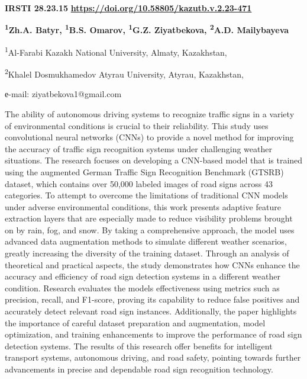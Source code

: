 \newpage
{\bfseries IRSTI 28.23.15}
\hfill {\bfseries \href{https://doi.org/10.58805/kazutb.v.2.23-471}{https://doi.org/10.58805/kazutb.v.2.23-471}}


\begin{center}
{\bfseries \textsuperscript{1}Zh.A. Batyr, \textsuperscript{1}B.S. Omarov,
\textsuperscript{1}G.Z. Ziyatbekova, \textsuperscript{2}A.D.
Mailybayeva}

\textsuperscript{1}Al-Farabi Kazakh National University, Almaty,
Kazakhstan,

\textsuperscript{2}Khalel Dosmukhamedov Atyrau University, Atyrau,
Kazakhstan,

е-mail: ziyatbekova1@gmail.com
\end{center}

The ability of autonomous driving systems to recognize traffic signs in
a variety of environmental conditions is crucial to their reliability.
This study uses convolutional neural networks (CNNs) to provide a novel
method for improving the accuracy of traffic sign recognition systems
under challenging weather situations. The research focuses on developing
a CNN-based model that is trained using the augmented German Traffic
Sign Recognition Benchmark (GTSRB) dataset, which contains over 50,000
labeled images of road signs across 43 categories. To attempt to
overcome the limitations of traditional CNN models under adverse
environmental conditions, this work presents adaptive feature extraction
layers that are especially made to reduce visibility problems brought on
by rain, fog, and snow. By taking a comprehensive approach, the model
uses advanced data augmentation methods to simulate different weather
scenarios, greatly increasing the diversity of the training dataset.
Through an analysis of theoretical and practical aspects, the study
demonstrates how CNNs enhance the accuracy and efficiency of road sign
detection systems in a different weather condition. Research evaluates
the model\textquotesingle s effectiveness using metrics such as
precision, recall, and F1-score, proving its capability to reduce false
positives and accurately detect relevant road sign instances.
Additionally, the paper highlights the importance of careful dataset
preparation and augmentation, model optimization, and training
enhancements to improve the performance of road sign detection systems.
The results of this research offer benefits for intelligent transport
systems, autonomous driving, and road safety, pointing towards further
advancements in precise and dependable road sign recognition technology.

